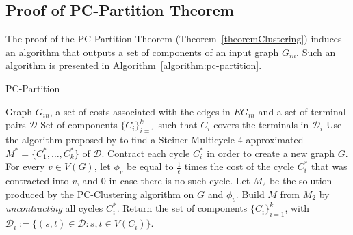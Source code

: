 \subsection{Proof of PC-Partition Theorem}

The proof of the PC-Partition Theorem (Theorem~\ref{theoremClustering}) induces an algorithm that outputs a set of components of an input graph \(G_{in}\). Such an algorithm is presented in Algorithm~\ref{algorithm:pc-partition}.

\begin{algorithm}[H]
\caption{PC-Partition}
\label{algorithm:pc-partition}
\begin{algorithmic}[1]

\Require Graph \(G_{in}\), a set of costs associated with the edges in \(E{G_{in}}\) and a set of terminal pairs \(\mathcal{D}\)
\Ensure Set of components \(\{C_i\}_{i=1}^k\) such that \(C_i\) covers the terminals in \(\mathcal{D}_i\)
\State Use the algorithm proposed by \cite{Pereira2018TheSM} to find a Steiner Multicycle 4-approximated \(M^\ast = \{C^\ast_1, \dots, C^\ast_k\}\) of \(\mathcal{D}\).
\State Contract each cycle \(C_i^\ast\) in order to create a new graph \(G\).
\State For every \(v \in V(G)\), let \(\phi_v\) be equal to \(\frac{1}{\epsilon}\) times the cost of the cycle \(C_i^\ast\) that was contracted into \(v\), and \(0\) in case there is no such cycle.
\State Let \(M_2\) be the solution produced by the PC-Clustering algorithm on \(G\) and \(\phi_v\).
\State Build \(M\) from \(M_2\) by \emph{uncontracting} all cycles \(C_i^\ast\).
\State Return the set of components \(\{C_i\}_{i=1}^k\), with \(\mathcal{D}_i := \{(s, t) \in \mathcal{D}: s, t \in V(C_i)\}\).

\end{algorithmic}
\end{algorithm}


